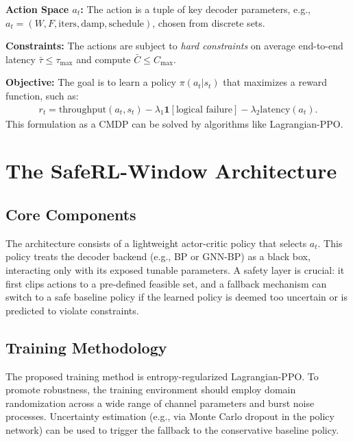 \documentclass[conference]{IEEEtran}
\begin{document}
\textbf{Action Space $a_t$:} The action is a tuple of key decoder parameters, e.g., $a_t=(W,F,\text{iters},\text{damp},\text{schedule})$, chosen from discrete sets.

\textbf{Constraints:} The actions are subject to \emph{hard constraints} on average end-to-end latency $\bar{\tau}\le\tau_{\max}$ and compute $\bar{C}\le C_{\max}$.

\textbf{Objective:} The goal is to learn a policy $\pi(a_t|s_t)$ that maximizes a reward function, such as:
\begin{align}
r_t = \text{throughput}(a_t,s_t) - \lambda_1 \mathbf{1}[\text{logical failure}] - \lambda_2 \text{latency}(a_t).
\end{align}
This formulation as a CMDP can be solved by algorithms like Lagrangian-PPO.

\section{The SafeRL-Window Architecture}
\subsection{Core Components}
The architecture consists of a lightweight actor-critic policy that selects $a_t$. This policy treats the decoder backend (e.g., BP or GNN-BP) as a black box, interacting only with its exposed tunable parameters. A safety layer is crucial: it first clips actions to a pre-defined feasible set, and a fallback mechanism can switch to a safe baseline policy if the learned policy is deemed too uncertain or is predicted to violate constraints.

\subsection{Training Methodology}
The proposed training method is entropy-regularized Lagrangian-PPO. To promote robustness, the training environment should employ domain randomization across a wide range of channel parameters and burst noise processes. Uncertainty estimation (e.g., via Monte Carlo dropout in the policy network) can be used to trigger the fallback to the conservative baseline policy.
\end{document}
